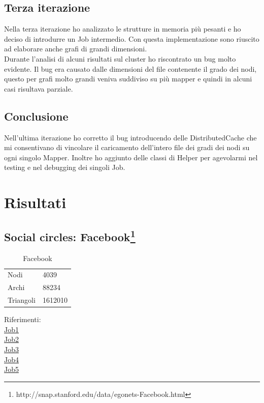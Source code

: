 \documentclass[paper=a4, fontsize=11pt]{scrartcl}	%
\numberwithin{equation}{section}															%
\numberwithin{figure}{section}																%
\numberwithin{table}{section}																%
\begin{document}
\subsection{Terza iterazione} 
Nella terza iterazione ho analizzato le strutture in memoria più pesanti e ho deciso di introdurre un Job intermedio. Con questa implementazione sono riuscito ad elaborare anche grafi di grandi dimensioni.\\ Durante l'analisi di alcuni risultati sul cluster ho riscontrato un bug molto evidente. Il bug era causato dalle dimensioni del file contenente il grado dei nodi, questo per grafi molto grandi veniva suddiviso su più mapper e quindi in alcuni casi risultava parziale.
\subsection{Conclusione} 
Nell'ultima iterazione ho corretto il bug introducendo delle DistributedCache che mi consentivano di vincolare il caricamento dell'intero file dei gradi dei nodi su ogni singolo Mapper. Inoltre ho aggiunto delle classi di Helper per agevolarmi nel testing e nel debugging dei singoli Job.
\section{Risultati}
\subsection{Social circles: Facebook\protect\footnote{http://snap.stanford.edu/data/egonets-Facebook.html}} 
\protect\begin{table}[]
	\centering
	\caption{Facebook}
	\label{my-label}
	\begin{tabular}{ll}
		Nodi		 & 4039 \\
		Archi		 & 88234 \\
		Triangoli	& 1612010 \\
	\end{tabular}
\end{table}
Riferimenti:\\	
\href{http://hadoop-compute0.di.univr.it:50030/jobdetails.jsp?jobid=job_201603141010_12286}{Job1}\\
\href{http://hadoop-compute0.di.univr.it:50030/jobdetails.jsp?jobid=job_201603141010_12287}{Job2}\\
\href{http://hadoop-compute0.di.univr.it:50030/jobdetails.jsp?jobid=job_201603141010_12288}{Job3}\\
\href{http://hadoop-compute0.di.univr.it:50030/jobdetails.jsp?jobid=job_201603141010_12289}{Job4}\\
\href{http://hadoop-compute0.di.univr.it:50030/jobdetails.jsp?jobid=job_201603141010_12290}{Job5}\\
\end{document}
